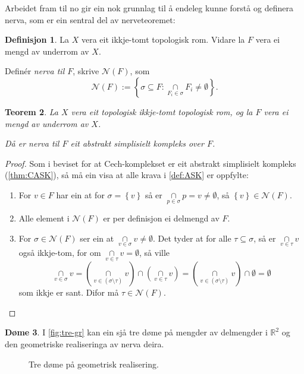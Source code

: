 \documentclass[a4paper, 12pt, norsk]{article}
\theoremstyle{plain}
\newtheorem{theorem}{Teorem}[section]
\theoremstyle{definition}
\newtheorem{definition}[theorem]{Definisjon}
\newtheorem{example}[theorem]{Døme}
\newcommand{\Rb}{\mathbb{R}}
\newcommand{\Nc}{\mathcal{N}}
\newcommand{\intersect}{ \mathop{\cap}\limits }
\newcommand{\set}[1]{ \left\{ #1 \right\} } %
\begin{document}
Arbeidet fram til no gir ein nok grunnlag til å endeleg kunne forstå og definera nerva, som er ein sentral del av nerveteoremet:

\begin{definition} \label{def:nerva}
	La $X$ vera eit ikkje-tomt topologisk rom. Vidare la $F$ vera ei mengd av underrom av $X$. 
	
	Definér \emph{nerva til $F$}, skrive $\Nc(F)$, som
	\begin{equation*}
		\Nc(F) := \left \{ \sigma \subseteq F : \intersect_{ F_i \in \sigma } F_i \neq \emptyset \right \}.
	\end{equation*}
\end{definition}

\begin{theorem}
	La $X$ vera eit topologisk ikkje-tomt topologisk rom, og la $F$ vera ei mengd av underrom av $X$.
	
	Då er nerva til $F$ eit abstrakt simplisielt kompleks over $F$.
\end{theorem}

\begin{proof}
	Som i beviset for at Cech-komplekset er eit abstrakt simplisielt kompleks (\autoref{thm:CASK}), så må ein visa at alle krava i \autoref{def:ASK} er oppfylte:
	\begin{enumerate}
		\item{ 
			For \( v \in F \) har ein at for \( \sigma = \set{ v } \) så er \( \intersect_{ p \in \sigma } p = v \neq \emptyset \), så \( \set{v} \in \Nc(F) \).
		}
		\item{ 
			Alle element i \( \Nc(F) \) er per definisjon ei delmengd av \( F \).
		}
		\item{  
			For \( \sigma \in \Nc(F) \) ser ein at \( \intersect_{v\in\sigma} v \neq \emptyset \). Det tyder at for alle \( \tau \subseteq \sigma \), så er \( \intersect_{v\in\tau} v \) også ikkje-tom, for om \( \intersect_{v\in\tau} v = \emptyset \), så ville 
			\[ 
				\intersect_{v\in\sigma} v = \left( \intersect_{v\in(\sigma\setminus\tau)} v \right) \intersect \left( \intersect_{v\in\tau} v \right) = \left( \intersect_{v\in(\sigma\setminus\tau)} v \right) \intersect \emptyset = \emptyset 
			\] 
			som ikkje er sant. Difor må \( \tau \in \Nc(F) \).
		}
	\end{enumerate}
\end{proof}

\begin{example}
	I \autoref{fig:tre-gr} kan ein sjå tre døme på mengder av delmengder i \( \Rb^2 \) og den geometriske realiseringa av nerva deira.
	\begin{figure}[htbp]
		\begin{center}
			
		\end{center}
		\caption{Tre døme på geometrisk realisering.}
		\label{fig:tre-gr}
	\end{figure}
\end{example}
\end{document}
